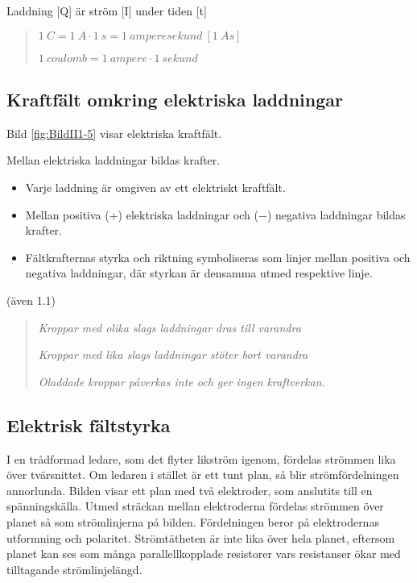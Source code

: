 Laddning [Q] är ström [I] under tiden [t]

\begin{quote}
\(1\ C = 1\ A \cdot 1\ s = 1\ amperesekund\ [1\ As]\)

\(1\ coulomb = 1\ ampere \cdot 1\ sekund\)
\end{quote}

\subsection{Kraftfält omkring elektriska laddningar}


Bild \ref{fig:BildII1-5} visar elektriska kraftfält.

Mellan elektriska laddningar bildas krafter.

\begin{itemize}
  \item Varje laddning är omgiven av ett elektriskt kraftfält.
  \item Mellan positiva (+) elektriska laddningar och (−) negativa laddningar
  bildas krafter.
  \item Fältkrafternas styrka och riktning symboliseras som linjer mellan
  positiva och negativa laddningar, där styrkan är densamma utmed respektive
  linje.
\end{itemize}

(även 1.1)

\begin{quote}
\emph{Kroppar med olika slags laddningar dras till varandra}

\emph{Kroppar med lika slags laddningar stöter bort varandra}

\emph{Oladdade kroppar påverkas inte och ger ingen kraftverkan.}
\end{quote}

\subsection{Elektrisk fältstyrka}


I en trådformad ledare, som det flyter likström igenom, fördelas strömmen lika
över tvärsnittet.
Om ledaren i stället är ett tunt plan, så blir strömfördelningen annorlunda.
Bilden visar ett plan med två elektroder, som anslutits till en spänningskälla.
Utmed sträckan mellan elektroderna fördelas strömmen över planet så som
strömlinjerna på bilden.
Fördelningen beror på elektrodernas utformning och polaritet.
Strömtätheten är inte lika över hela planet, eftersom planet kan ses som många
parallellkopplade resistorer vars resistanser ökar med tilltagande
strömlinjelängd.

